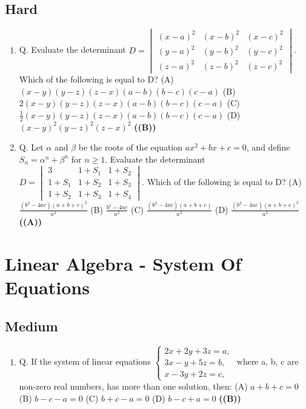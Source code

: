 \documentclass{article}
\begin{document}
\subsection{Hard}
\begin{enumerate}
\item Q. Evaluate the determinant
$D = \begin{vmatrix} (x - a)^2 & (x - b)^2 & (x - c)^2 \\ (y - a)^2 & (y - b)^2 & (y - c)^2 \\ (z - a)^2 & (z - b)^2 & (z - c)^2 \end{vmatrix}$.
Which of the following is equal to D?
(A) $(x - y)(y - z)(z - x)(a - b)(b - c)(c - a)$
(B) $2 (x - y)(y - z)(z - x)(a - b)(b - c)(c - a)$
(C) $\frac{1}{2} (x - y)(y - z)(z - x)(a - b)(b - c)(c - a)$
(D) $(x - y)^2(y - z)^2(z - x)^2$ \hfill \textbf{((B))}
\item Q. Let $\alpha$ and $\beta$ be the roots of the equation $ax^2 + bx + c = 0$, and define $S_n = \alpha^n + \beta^n$ for $n \ge 1$. Evaluate the determinant
$D = \begin{vmatrix} 3 & 1+S_1 & 1+S_2 \\ 1+S_1 & 1+S_2 & 1+S_3 \\ 1+S_2 & 1+S_3 & 1+S_4 \end{vmatrix}$.
Which of the following is equal to D?
(A) $\frac{(b^2 - 4ac) (a + b + c)^2}{a^4}$
(B) $\frac{b^2-4ac}{a^2}$
(C) $\frac{(b^2 - 4ac) (a + b + c)}{a^3}$
(D) $\frac{(b^2 - 4ac) (a + b + c)^2}{a^3}$ \hfill \textbf{((A))}
\end{enumerate}
\section{Linear Algebra - System Of Equations}
\subsection{Medium}
\begin{enumerate}
\item Q. If the system of linear equations
$\begin{cases} 2x + 2y + 3z = a, \\ 3x - y + 5z = b, \\ x - 3y + 2z = c, \end{cases}$
where a, b, c are non-zero real numbers, has more than one solution, then:
(A) $a + b + c = 0$
(B) $b - c - a = 0$
(C) $b + c - a = 0$
(D) $b - c + a = 0$ \hfill \textbf{((B))}
\end{enumerate}
\end{document}
